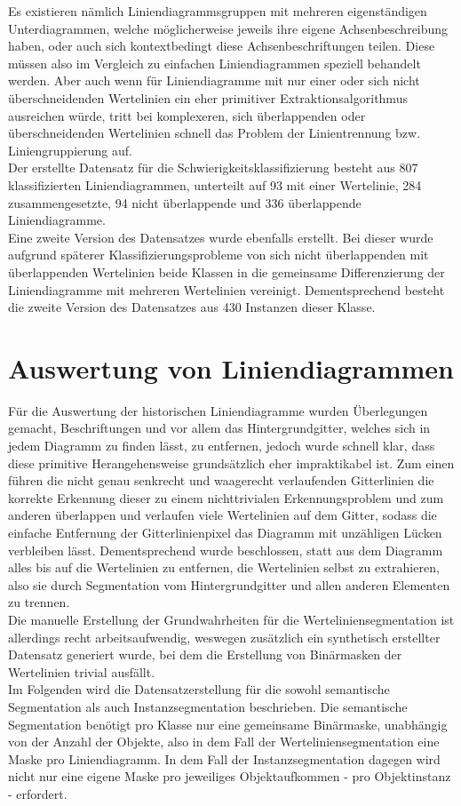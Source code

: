 Es existieren nämlich Liniendiagrammsgruppen mit mehreren eigenständigen Unterdiagrammen, welche möglicherweise jeweils ihre eigene Achsenbeschreibung haben, oder auch sich kontextbedingt diese Achsenbeschriftungen teilen. Diese müssen also im Vergleich zu einfachen Liniendiagrammen speziell behandelt werden. Aber auch wenn für Liniendiagramme mit nur einer oder sich nicht überschneidenden Wertelinien ein eher primitiver Extraktionsalgorithmus ausreichen würde, tritt bei komplexeren, sich überlappenden oder überschneidenden Wertelinien schnell das Problem der Linientrennung bzw. Liniengruppierung auf.
\\
Der erstellte Datensatz für die Schwierigkeitsklassifizierung besteht aus 807 klassifizierten Liniendiagrammen, unterteilt auf 93 mit einer Wertelinie, 284 zusammengesetzte, 94 nicht überlappende und 336 überlappende Liniendiagramme.
\\
Eine zweite Version des Datensatzes wurde ebenfalls erstellt. Bei dieser wurde aufgrund späterer Klassifizierungsprobleme von sich nicht überlappenden mit überlappenden Wertelinien beide Klassen in die gemeinsame Differenzierung der Liniendiagramme mit mehreren Wertelinien vereinigt. Dementsprechend besteht die zweite Version des Datensatzes aus 430 Instanzen dieser Klasse.

\section{Auswertung von Liniendiagrammen}

Für die Auswertung der historischen Liniendiagramme wurden Überlegungen gemacht, Beschriftungen und vor allem das Hintergrundgitter, welches sich in jedem Diagramm zu finden lässt, zu entfernen, jedoch wurde schnell klar, dass diese primitive Herangehensweise grundsätzlich eher impraktikabel ist. Zum einen führen die nicht genau senkrecht und waagerecht verlaufenden Gitterlinien die korrekte Erkennung dieser zu einem nichttrivialen Erkennungsproblem und zum anderen überlappen und verlaufen viele Wertelinien auf dem Gitter, sodass die einfache Entfernung der Gitterlinienpixel das Diagramm mit unzähligen Lücken verbleiben lässt. Dementsprechend wurde beschlossen, statt aus dem Diagramm alles bis auf die Wertelinien zu entfernen, die Wertelinien selbst zu extrahieren, also sie durch Segmentation vom Hintergrundgitter und allen anderen Elementen zu trennen.
\\
Die manuelle Erstellung der Grundwahrheiten für die Werteliniensegmentation ist allerdings recht arbeitsaufwendig, weswegen zusätzlich ein synthetisch erstellter Datensatz generiert wurde, bei dem die Erstellung von Binärmasken der Wertelinien trivial ausfällt.
\\
Im Folgenden wird die Datensatzerstellung für die sowohl semantische Segmentation als auch Instanzsegmentation beschrieben. Die semantische Segmentation benötigt pro Klasse nur eine gemeinsame Binärmaske, unabhängig von der Anzahl der Objekte, also in dem Fall der Werteliniensegmentation eine Maske pro Liniendiagramm. In dem Fall der Instanzsegmentation dagegen wird nicht nur eine eigene Maske pro jeweiliges Objektaufkommen - pro Objektinstanz - erfordert.

